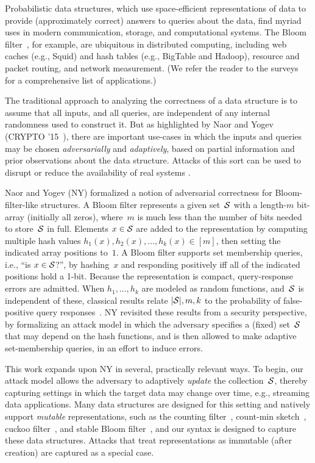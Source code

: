 Probabilistic data structures, which use space-efficient
representations of data to provide (approximately correct) answers to
queries about the data, find myriad uses in modern communication,
storage, and computational systems.  The Bloom
filter~\cite{bloom1970space}, for example, are
ubiquitous in distributed computing, including web caches (e.g., Squid) and hash
tables (e.g., BigTable and Hadoop), resource and packet routing, and network
measurement. (We refer the reader to the
surveys~\cite{broder2004network,tarkoma2012theory} for a comprehensive list of
applications.) 

The traditional approach to analyzing the correctness of a data structure is to
assume that all inputs, and all queries, are independent of any internal
randomness used to construct it.  But as highlighted by Naor and
Yogev (CRYPTO '15~\cite{naor2015bloom}), there are important use-cases in which the inputs
and queries may be chosen \emph{adversarially} and \emph{adaptively}, based on
partial information and prior observations about the data structure. Attacks of
this sort can be used to disrupt or reduce the availability of real systems
\cite{crosby2003denial,gerbet2015power,lipton1993clocked}.

Naor and Yogev (NY) formalized a notion of adversarial correctness for
Bloom-filter-like structures. A Bloom filter represents a given
set~$\mathcal{S}$ with a length-$m$ bit-array (initially all zeros),
where~$m$ is much less than the number of bits needed to store~$\mathcal{S}$
in full.  Elements $x \in \mathcal{S}$ are added to the representation by
computing multiple hash values $h_1(x),h_2(x),\ldots,h_k(x)\in [m]$, then setting the
indicated array positions to~$1$.  A Bloom filter supports set membership
queries, i.e., ``is $x\in\mathcal{S}$?'', by hashing~$x$ and responding positively iff
all of the indicated positions hold a 1-bit.  Because the
representation is compact, query-response errors are admitted.
When $h_1,\ldots,h_k$ are modeled
as random functions, and~$\mathcal{S}$ is independent of these, classical results
relate $|\mathcal{S}|,m,k$ to the probability of false-positive query
responses~\cite{broder2004network,kirsch2006less}.
%
NY revisited these results from a security perspective, by
formalizing an attack model in which the adversary specifies a
(fixed) set~$\mathcal{S}$ that may
depend on the hash functions, and is then allowed to make adaptive
set-membership queries, in an effort to induce errors.

This work expands upon NY in several, practically relevant ways.  To begin, our
attack model allows the adversary to adaptively \emph{update} the
collection~$\mathcal{S}$, thereby capturing settings in which the target data may
change over time, e.g., streaming data applications. Many data structures are
designed for this setting and natively support \emph{mutable} representations,
such as the counting filter~\cite{fan2000summary}, count-min
sketch~\cite{cormode2005improved}, cuckoo filter~\cite{fan2014cuckoo}, and
stable Bloom filter~\cite{deng2006approximately}, and our syntax is designed to
capture these data structures. Attacks that treat representations as
immutable (after creation) are captured as a special case.

